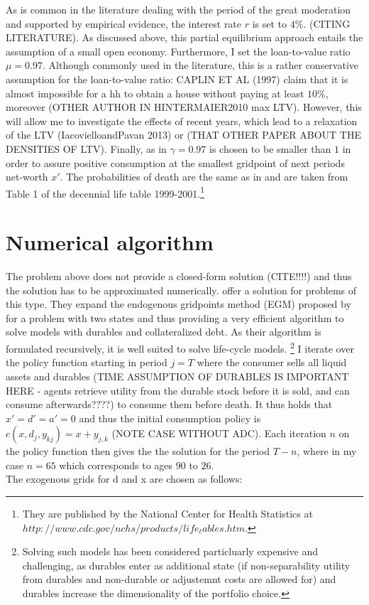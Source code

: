 \documentclass[a4paper,12pt,legno]{article}
\begin{document}
As is common in the literature dealing with the period of the great moderation and supported by empirical evidence, the interest rate $r$ is set to $4\%$. (CITING LITERATURE). As discussed above, this partial equilibrium approach entails the assumption of a small open economy. Furthermore, I set the loan-to-value ratio $\mu = 0.97$. Although commonly used in the literature, this is a rather conservative assumption for the loan-to-value ratio: CAPLIN ET AL (1997) claim that it is almost impossible for a hh to obtain a house without paying at least $10\%$, moreover (OTHER AUTHOR IN HINTERMAIER2010 max LTV). However, this will allow me to investigate the effects of recent years, which lead to a relaxation of the LTV (IacovielloandPavan 2013) or (THAT OTHER PAPER ABOUT THE DENSITIES OF LTV). Finally, as in \cite{hintermaier2010} $\gamma = 0.97$ is chosen to be smaller than $1$ in order to assure positive consumption at the smallest gridpoint of next periods net-worth $x'$. The probabilities of death are the same as in \cite{hintermaier2011} and are taken from Table 1 of the decennial life table 1999-2001.\footnote{They are published by the National Center for Health Statistics at $http://www.cdc.gov/nchs/products/life_tables.htm$.} 

\section{Numerical algorithm}

The problem above does not provide a closed-form solution (CITE!!!!) and thus the solution has to be approximated numerically. \cite{hintermaier2010} offer a solution for problems of this type. They expand the endogenous gridpoints method (EGM) proposed by \cite{carroll2006} for a problem with two states and thus providing a very efficient algorithm to solve models with durables and collateralized debt. As their algorithm is formulated recursively, it is well suited to solve life-cycle models. \footnote{Solving such models has been considered particluarly expensive and challenging, as durables enter as additional state (if non-separability utility from durables and non-durable or adjustemnt costs are allowed for) and durables increase the dimensionality of the portfolio choice.\citep{hintermaier2010}} I iterate over the policy function starting in period $j = T$ where the consumer sells all liquid assets and durables (TIME ASSUMPTION OF DURABLES IS IMPORTANT HERE - agents retrieve utility from the durable stock before it is sold, and can consume afterwards????) to consume them before death. It thus holds that $x'=d'=a'=0$ and thus the initial consumption policy is $c(x,d_{j},y_{kj})=x+y_{j,k}$ (NOTE CASE WITHOUT ADC). Each iteration $n$ on the policy function then gives the the solution for the period $T-n$, where in my case $n=65$ which corresponds to ages $90$ to $26$. \\
The exogenous grids for d and x are chosen as follows: 
\end{document}
